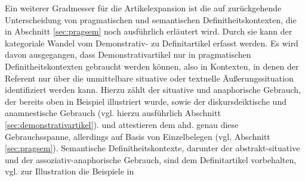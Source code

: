 Ein weiterer Gradmesser für die Artikelexpansion ist die auf \textcite{Lobner1985,Lobner1998} zurückgehende Unterscheidung von pragmatischen und semantischen Definitheitskontexten, die in Abschnitt \ref{sec:pragsem} noch ausführlich erläutert wird. Durch sie kann der kategoriale Wandel vom Demonstrativ- zu Definitartikel erfasst werden. Es wird davon ausgegangen, dass Demonstrativartikel nur in pragmatischen Definitheitskontexten gebraucht werden können, also in Kontexten, in denen der Referent nur über die unmittelbare situative oder textuelle Äußerungssituation identifiziert werden kann. Hierzu zählt der situative und anaphorische Gebrauch, der bereits oben in Beispiel  illustriert wurde, sowie der diskursdeiktische und anamnestische Gebrauch (vgl. hierzu ausführlich Abschnitt \ref{sec:demonstrativartikel}). \textcite[84--88]{Philippi1997} und \textcite[112--117]{Demske2001} attestieren dem ahd.  genau diese Gebrauchsspanne, allerdings auf Basis von Einzelbelegen (vgl. Abschnitt \ref{sec:pragsem}). Semantische Definitheitskontexte, darunter der abstrakt-situative und der assoziativ-anaphorische Gebrauch, sind dem Definitartikel vorbehalten, vgl. zur Illustration die Beispiele in 

